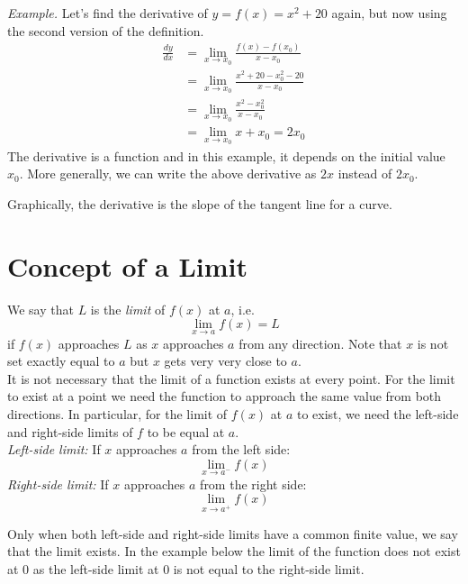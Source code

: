 \documentclass{./../Latex/handout}
\begin{document}
\textit{Example.} Let's find the derivative of $y=f(x)=x^{2}+20$ again, but now using the second version of the definition.  
\begin{align*} \frac{d y}{d x}&= \lim_{ x \rightarrow x_0} \frac{f(x)-f(x_{0})}{x-x_0} \\
& = \lim_{ x \rightarrow x_0} \frac{x^2+20-x_0^2-20}{x-x_0} \\
& = \lim_{ x \rightarrow x_0} \frac{x^2-x_0^2}{x-x_0} \\
& = \lim_{ x \rightarrow x_0} x+x_0 = 2x_0
\end{align*}
The derivative is a function and in this example, it depends on the initial value $x_0$. More generally, we can write the above derivative as $2x$ instead of $2x_0$. 

Graphically, the derivative is the slope of the tangent line for a curve. 

\section{Concept of a Limit}

We say that $L$ is the \textit{limit} of $f(x)$ at $a$, i.e. $$\lim_{x \rightarrow a} f(x) = L$$
if $f(x)$ approaches $L$ as $x$ approaches $a$ from any direction. Note that $x$ is not set exactly equal to $a$ but $x$ gets very very close to $a$.\\

It is not necessary that the limit of a function exists at every point. For the limit to exist at a point we need the function to approach the same value from both directions. In particular, for the limit of $f(x)$ at $a$ to exist, we need the left-side and right-side limits of $f$ to be equal at $a$. \\
 
\textit{Left-side limit:} If $x$ approaches $a$ from the left side:
$$\lim_{x \rightarrow a^-} f(x) $$
 \textit{Right-side limit:} If $x$ approaches $a$ from the right side:
$$\lim_{x \rightarrow a^+} f(x) $$

Only when both left-side and right-side limits have a common finite value, we say that the limit exists. In the example below the limit of the function does not exist at 0 as the left-side limit at 0 is not equal to the right-side limit. 
\end{document}

